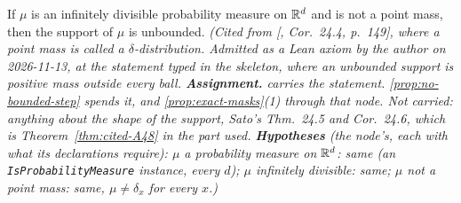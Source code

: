 \begin{theorem}
\label{thm:cited-A46}
\leanok
If $\mu$ is an infinitely divisible probability measure on $\mathbb{R}^d$ and is not a point mass, then
the support of $\mu$ is unbounded.
\statusA\quad{}\quad\emph{(Cited from [, Cor.~24.4, p.~149], where a
point mass is called a $\delta$-distribution. Admitted as a Lean axiom by the author on
2026-11-13, at the statement typed in the skeleton, where an unbounded support is positive mass
outside every ball. \textbf{Assignment.}  carries the statement. \ref{prop:no-bounded-step}
spends it, and \ref{prop:exact-masks}(1) through that node. Not carried: anything about the shape of the support, Sato's
Thm.~24.5 and Cor.~24.6, which is Theorem~\ref{thm:cited-A48} in the part used.
\textbf{Hypotheses} (the node's, each with what its declarations require): $\mu$ a probability measure
on $\mathbb{R}^d$: same (an \texttt{IsProbabilityMeasure} instance, every $d$); $\mu$ infinitely
divisible: same; $\mu$ not a point mass: same, $\mu \ne \delta_x$ for every $x$.)}
\end{theorem}

